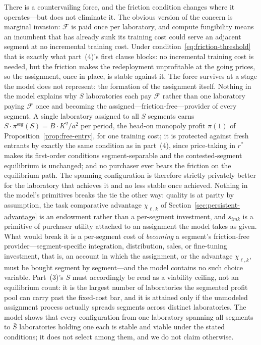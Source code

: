 \documentclass[11pt]{article}
\begin{document}
There is a countervailing force, and the friction condition changes where it operates---but does not eliminate it. The obvious version of the concern is marginal invasion: $\mathcal F$ is paid once per laboratory, and compute fungibility means an incumbent that has already sunk its training cost could serve an adjacent segment at no incremental training cost. Under condition~\eqref{eq:friction-threshold} that is exactly what part~(4)'s first clause blocks: no incremental training cost is needed, but the friction makes the redeployment unprofitable at the going prices, so the assignment, once in place, is stable against it. The force survives at a stage the model does not represent: the formation of the assignment itself. Nothing in the model explains why $S$ laboratories each pay $\mathcal F$ rather than one laboratory paying $\mathcal F$ once and becoming the assigned---friction-free---provider of every segment. A single laboratory assigned to all $S$ segments earns $S\cdot\pi^{\mathrm{seg}}(S)=B\cdot K^{2}/a^{2}$ per period, the head-on monopoly profit $\pi(1)$ of Proposition~\ref{prop:free-entry}, for one training cost; it is protected against fresh entrants by exactly the same condition as in part~(4), since price-taking in $r^{*}$ makes its first-order conditions segment-separable and the contested-segment equilibrium is unchanged; and no purchaser ever bears the friction on the equilibrium path. The spanning configuration is therefore strictly privately better for the laboratory that achieves it and no less stable once achieved. Nothing in the model's primitives breaks the tie the other way: quality is at parity by assumption, the task comparative advantage $\chi_{\ell,k}$ of Section~\ref{sec:persistent-advantage} is an endowment rather than a per-segment investment, and $s_{imk}$ is a primitive of purchaser utility attached to an assignment the model takes as given. What would break it is a per-segment cost of \emph{becoming} a segment's friction-free provider---segment-specific integration, distribution, sales, or fine-tuning investment, that is, an account in which the assignment, or the advantage $\chi_{\ell,k}$, must be bought segment by segment---and the model contains no such choice variable. Part~(3)'s $\bar S$ must accordingly be read as a viability ceiling, not an equilibrium count: it is the largest number of laboratories the segmented profit pool can carry past the fixed-cost bar, and it is attained only if the unmodeled assignment process actually spreads segments across distinct laboratories. The model shows that every configuration from one laboratory spanning all segments to $\bar S$ laboratories holding one each is stable and viable under the stated conditions; it does not select among them, and we do not claim otherwise.
\end{document}
